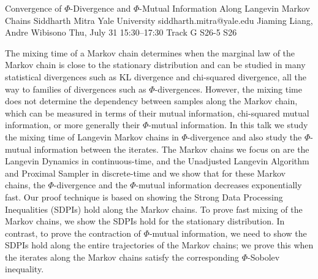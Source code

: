\begin{talk}
  {Convergence of $\Phi$-Divergence and $\Phi$-Mutual Information Along Langevin Markov Chains}%
  {Siddharth Mitra}%
  {Yale University}%
  {siddharth.mitra@yale.edu}%
  {Jiaming Liang, Andre Wibisono}%
  {}%
  {Thu, July 31 15:30–17:30 Track G}%
  {S26-5}%
  {S26}%
  
				
			
The mixing time of a Markov chain determines when the marginal law of the Markov chain is close to the stationary distribution and can be studied in many statistical divergences such as KL divergence and chi-squared divergence, all the way to families of divergences such as $\Phi$-divergences. However, the mixing time does not determine the dependency between samples along the Markov chain, which can be measured in terms of their mutual information, chi-squared mutual information, or more generally their $\Phi$-mutual information. In this talk we study the mixing time of Langevin Markov chains in $\Phi$-divergence and also study the $\Phi$-mutual information between the iterates. The Markov chains we focus on are the Langevin Dynamics in continuous-time, and the Unadjusted Langevin Algorithm and Proximal Sampler in discrete-time and we show that for these Markov chains, the $\Phi$-divergence and the $\Phi$-mutual information decreases exponentially fast. Our proof technique is based on showing the Strong Data Processing Inequalities (SDPIs) hold along the Markov chains. To prove fast mixing of the Markov chains, we show the SDPIs hold for the stationary distribution. In contrast, to prove the contraction of $\Phi$-mutual information, we need to show the SDPIs hold along the entire trajectories of the Markov chains; we prove this when the iterates along the Markov chains satisfy the corresponding $\Phi$-Sobolev inequality.


\medskip


\end{talk}

